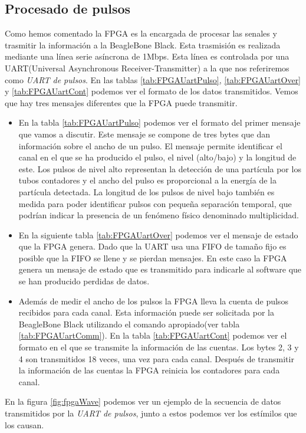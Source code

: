 	\subsection{Procesado de pulsos}
		Como hemos comentado la FPGA es la encargada de procesar las senales y trasmitir la información a la BeagleBone Black. Esta trasmisión
		es realizada mediante una línea serie asíncrona de 1Mbps. Esta línea es controlada por una UART(Universal Asynchronous
		Receiver-Transmitter) a la que nos referiremos como \emph{UART de pulsos}. En las tablas \ref{tab:FPGAUartPulso},
		\ref{tab:FPGAUartOver} y \ref{tab:FPGAUartCont} podemos ver el formato de los datos transmitidos. Vemos que hay tres mensajes
		diferentes que la FPGA puede transmitir.
		\begin{itemize}
			\item	En la tabla \ref{tab:FPGAUartPulso} podemos ver el formato del primer mensaje que vamos a discutir. Este mensaje se
				compone de tres bytes que dan información sobre el ancho de un pulso. El mensaje permite identificar el canal en el
				que se ha producido el pulso, el nivel (alto/bajo) y la longitud de este. Los pulsos de nivel alto representan la
				detección de una partícula por los tubos contadores y el ancho del pulso es proporcional a la energía de la partícula
				detectada. La longitud de los pulsos de nivel bajo también es medida para poder identificar pulsos con pequeña
				separación temporal, que podrían indicar la presencia de un fenómeno físico denominado multiplicidad.
			\item 	En la siguiente tabla \ref{tab:FPGAUartOver} podemos ver el mensaje de estado que la FPGA genera. Dado que la UART usa
				una FIFO de tamaño fijo es posible que la FIFO se llene y se pierdan mensajes. En este caso la FPGA genera un mensaje
				de estado que es transmitido para indicarle al software que se han producido perdidas de datos.
			\item	Además de medir el ancho de los pulsos la FPGA lleva la cuenta de pulsos recibidos para cada canal. Esta información
				puede ser solicitada por la BeagleBone Black utilizando el comando apropiado(ver tabla \ref{tab:FPGAUartComm}). En la
				tabla \ref{tab:FPGAUartCont} podemos ver el formato en el que se transmite la información de las cuentas. Los bytes 2,
				3 y 4 son transmitidos 18 veces, una vez para cada canal. Después de transmitir la información de las cuentas la FPGA
				reinicia los contadores para cada canal.
		\end{itemize}
		En la figura \ref{fig:fpgaWave} podemos ver un ejemplo de la secuencia de datos transmitidos por la \emph{UART de pulsos}, junto a
		estos podemos ver los estímilos que los causan. 

